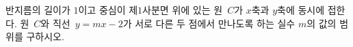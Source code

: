 반지름의 길이가 $1$이고 중심이 제$1$사분면 위에 있는 원~$C$가 $x$축과 $y$축에 동시에 접한다. 원~$C$와 직선~$y=mx-2$가 서로 다른 두 점에서 만나도록 하는 실수 $m$의 값의 범위를 구하시오.
